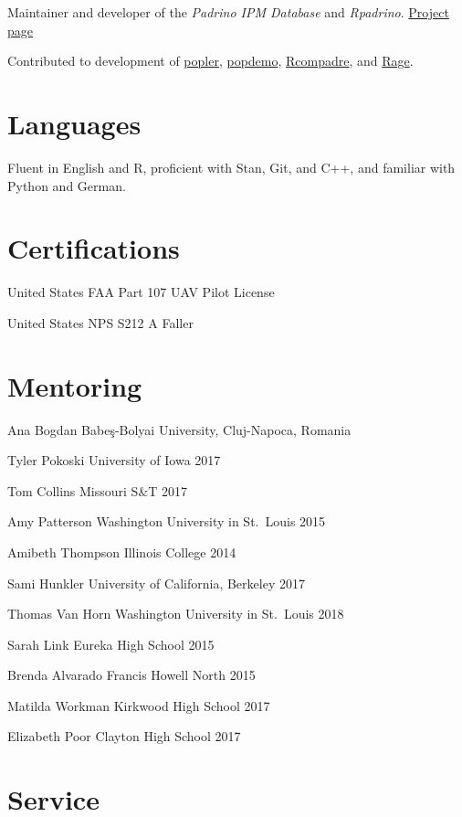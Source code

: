 \documentclass[11pt,]{article}
\begin{document}
Maintainer and developer of the \emph{Padrino IPM Database} and
\emph{Rpadrino}. \href{https://github.com/levisc8/RPadrino}{Project
page}

Contributed to development of
\href{https://github.com/AldoCompagnoni/popler}{popler},
\href{https://github.com/iainmstott/popdemo}{popdemo},
\href{https://github.com/jonesor/Rcompadre}{Rcompadre}, and
\href{https://github.com/jonesor/Rage}{Rage}.

\hypertarget{languages}{%
\section{Languages}\label{languages}}

Fluent in English and R, proficient with Stan, Git, and C++, and
familiar with Python and German.

\hypertarget{certifications}{%
\section{Certifications}\label{certifications}}

United States FAA Part 107 UAV Pilot License

United States NPS S212 A Faller

\hypertarget{mentoring}{%
\section{Mentoring}\label{mentoring}}

Ana Bogdan \hfill Babe\c s-Bolyai University, Cluj-Napoca, Romania

Tyler Pokoski \hfill  University of Iowa 2017

Tom Collins \hfill Missouri S\&T 2017

Amy Patterson \hfill Washington University in St.~Louis 2015

Amibeth Thompson \hfill Illinois College 2014

Sami Hunkler \hfill University of California, Berkeley 2017

Thomas Van Horn \hfill Washington University in St.~Louis 2018

Sarah Link \hfill Eureka High School 2015

Brenda Alvarado \hfill Francis Howell North 2015

Matilda Workman \hfill Kirkwood High School 2017

Elizabeth Poor \hfill Clayton High School 2017

\hypertarget{service}{%
\section{Service}\label{service}}
\end{document}
